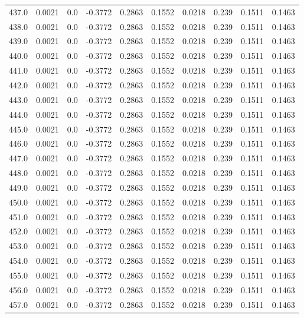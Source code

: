 \begin{longtable}{lrrrrrrrrr}
437.0 & 0.0021 & 0.0 & -0.3772 & 0.2863 & 0.1552 & 0.0218 & 0.239 & 0.1511 & 0.1463 \\
438.0 & 0.0021 & 0.0 & -0.3772 & 0.2863 & 0.1552 & 0.0218 & 0.239 & 0.1511 & 0.1463 \\
439.0 & 0.0021 & 0.0 & -0.3772 & 0.2863 & 0.1552 & 0.0218 & 0.239 & 0.1511 & 0.1463 \\
440.0 & 0.0021 & 0.0 & -0.3772 & 0.2863 & 0.1552 & 0.0218 & 0.239 & 0.1511 & 0.1463 \\
441.0 & 0.0021 & 0.0 & -0.3772 & 0.2863 & 0.1552 & 0.0218 & 0.239 & 0.1511 & 0.1463 \\
442.0 & 0.0021 & 0.0 & -0.3772 & 0.2863 & 0.1552 & 0.0218 & 0.239 & 0.1511 & 0.1463 \\
443.0 & 0.0021 & 0.0 & -0.3772 & 0.2863 & 0.1552 & 0.0218 & 0.239 & 0.1511 & 0.1463 \\
444.0 & 0.0021 & 0.0 & -0.3772 & 0.2863 & 0.1552 & 0.0218 & 0.239 & 0.1511 & 0.1463 \\
445.0 & 0.0021 & 0.0 & -0.3772 & 0.2863 & 0.1552 & 0.0218 & 0.239 & 0.1511 & 0.1463 \\
446.0 & 0.0021 & 0.0 & -0.3772 & 0.2863 & 0.1552 & 0.0218 & 0.239 & 0.1511 & 0.1463 \\
447.0 & 0.0021 & 0.0 & -0.3772 & 0.2863 & 0.1552 & 0.0218 & 0.239 & 0.1511 & 0.1463 \\
448.0 & 0.0021 & 0.0 & -0.3772 & 0.2863 & 0.1552 & 0.0218 & 0.239 & 0.1511 & 0.1463 \\
449.0 & 0.0021 & 0.0 & -0.3772 & 0.2863 & 0.1552 & 0.0218 & 0.239 & 0.1511 & 0.1463 \\
450.0 & 0.0021 & 0.0 & -0.3772 & 0.2863 & 0.1552 & 0.0218 & 0.239 & 0.1511 & 0.1463 \\
451.0 & 0.0021 & 0.0 & -0.3772 & 0.2863 & 0.1552 & 0.0218 & 0.239 & 0.1511 & 0.1463 \\
452.0 & 0.0021 & 0.0 & -0.3772 & 0.2863 & 0.1552 & 0.0218 & 0.239 & 0.1511 & 0.1463 \\
453.0 & 0.0021 & 0.0 & -0.3772 & 0.2863 & 0.1552 & 0.0218 & 0.239 & 0.1511 & 0.1463 \\
454.0 & 0.0021 & 0.0 & -0.3772 & 0.2863 & 0.1552 & 0.0218 & 0.239 & 0.1511 & 0.1463 \\
455.0 & 0.0021 & 0.0 & -0.3772 & 0.2863 & 0.1552 & 0.0218 & 0.239 & 0.1511 & 0.1463 \\
456.0 & 0.0021 & 0.0 & -0.3772 & 0.2863 & 0.1552 & 0.0218 & 0.239 & 0.1511 & 0.1463 \\
457.0 & 0.0021 & 0.0 & -0.3772 & 0.2863 & 0.1552 & 0.0218 & 0.239 & 0.1511 & 0.1463 \\

\end{longtable}
